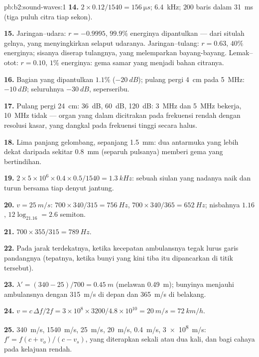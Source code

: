 \begin{solution}{pb:b2:sound-waves:1}
\textbf{14.} $2 \times 0.12/1540 = \qty{156}{\micro s}$; \qty{6.4}{kHz}; $200$ baris dalam
\qty{31}{ms} (tiga puluh citra tiap sekon).

\textbf{15.} Jaringan--udara: $r = -0.9995$, $99.9\%$ energinya dipantulkan
--- dari situlah gelnya, yang menyingkirkan selaput udaranya. Jaringan--tulang: $r = 0.63$,
$40\%$ energinya; sisanya diserap tulangnya, yang melemparkan
bayang-bayang. Lemak--otot: $r = 0.10$, $1\%$ energinya: gema samar yang menjadi bahan
citranya.

\textbf{16.} Bagian yang dipantulkan $1.1\%$ ($-\qty{20}{dB}$); pulang pergi
\qty{4}{cm} pada \qty{5}{MHz}: $-\qty{10}{dB}$; seluruhnya $-\qty{30}{dB}$, seperseribu.

\textbf{17.} Pulang pergi \qty{24}{cm}: \qty{36}{dB}, \qty{60}{dB}, \qty{120}{dB}: \qty{3}{MHz}
dan \qty{5}{MHz} bekerja, \qty{10}{MHz} tidak --- organ yang dalam dicitrakan pada
frekuensi rendah dengan resolusi kasar, yang dangkal pada frekuensi
tinggi secara halus.

\textbf{18.} Lima panjang gelombang, sepanjang \qty{1.5}{mm}: dua antarmuka yang lebih dekat
daripada sekitar \qty{0.8}{mm} (separuh pulsanya) memberi gema yang bertindihan.

\textbf{19.} $2 \times 5 \times 10^6 \times 0.4 \times 0.5/1540 = \qty{1.3}{kHz}$: sebuah siulan yang
nadanya naik dan turun bersama tiap denyut jantung.

\textbf{20.} $v = \qty{25}{m/s}$: $700 \times 340/315 = \qty{756}{Hz}$, $700 \times 340/365 =
\qty{652}{Hz}$; nisbahnya $1.16$, $12\log_21.16 = 2.6$ semiton.

\textbf{21.} $700 \times 355/315 = \qty{789}{Hz}$.

\textbf{22.} Pada jarak terdekatnya, ketika kecepatan ambulansnya
tegak lurus garis pandangnya (tepatnya, ketika bunyi yang kini
tiba itu dipancarkan di titik tersebut).

\textbf{23.} $\lambda' = (340 - 25)/700 = \qty{0.45}{m}$ (melawan \qty{0.49}{m}); bunyinya
menjauhi ambulansnya dengan \qty{315}{m/s} di depan dan \qty{365}{m/s}
di belakang.

\textbf{24.} $v = c\,\Delta f/2f = 3 \times 10^8 \times 3200/4.8 \times 10^{10} = \qty{20}{m/s} =
\qty{72}{km/h}$.

\textbf{25.} \qty{340}{m/s}, \qty{1540}{m/s}, \qty{25}{m/s}, \qty{20}{m/s}, \qty{0.4}{m/s},
\qty{3e8}{m/s}: $f' = f(c + v_o)/(c - v_s)$, yang diterapkan sekali atau dua kali, dan bagi
cahaya pada kelajuan rendah.
\end{solution}
